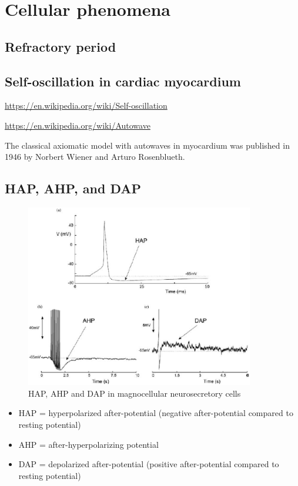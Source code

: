  
\chapter{Cellular phenomena}
\label{chap:cellular-phenomena}


\section{Refractory period}
\label{sec:refractory-period}

\section{Self-oscillation in cardiac myocardium}

\url{https://en.wikipedia.org/wiki/Self-oscillation}

\url{https://en.wikipedia.org/wiki/Autowave}


The classical axiomatic model with autowaves in myocardium was published in 1946
by Norbert Wiener and Arturo Rosenblueth.


\section{HAP, AHP, and DAP}
\label{sec:hap-ahp-dap}

\begin{figure}[hbt]
  \centerline{\includegraphics[height=8cm,
    angle=0]{./images/AHP_HAP_DAP.eps}}
\caption{HAP, AHP and DAP in magnocellular neurosecretory cells}
\label{fig:HAP_AHP_DAP}
\end{figure}

\begin{itemize}
\item HAP = hyperpolarized after-potential (negative after-potential
  compared to resting potential)
\item AHP = after-hyperpolarizing potential 
\item DAP = depolarized after-potential (positive after-potential
  compared to resting potential)
\end{itemize}

